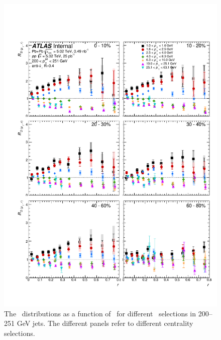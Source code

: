 \begin{figure}[h]
\includegraphics[width=1.0\textwidth]{figures/results/RDpT_dR_jet9}
\caption{The \RDptr\ distributions as a function of \rvar\ for different \pt\ selections in 200--251 GeV jets. The different panels refer to different centrality selections.}
\label{fig:fullset_rptr_j9}
\end{figure}

